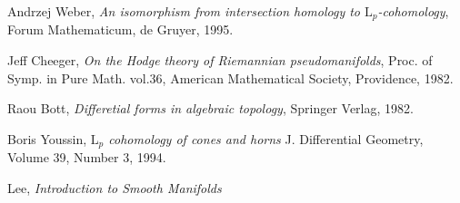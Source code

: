 \documentclass[licencjacka]{pracamgr}
\theoremstyle{definition}
\theoremstyle{definition}
\theoremstyle{plain}
\theoremstyle{plain}
\begin{document}
\begin{thebibliography}{99}

 Andrzej Weber, \textit{An isomorphism from
  intersection homology to $\mathrm{L}_p$-cohomology}, Forum
  Mathematicum, de Gruyer, 1995.
  
 Jeff Cheeger, \textit{On the Hodge theory
  of Riemannian pseudomanifolds}, Proc. of Symp. in Pure Math. vol.36,
  American Mathematical Society, Providence, 1982.

 Raou Bott, \textit{Differetial forms in algebraic
  topology}, Springer Verlag, 1982.

 Boris Youssin, \textit{$\mathrm{L}_p$
  cohomology of cones and horns } J. Differential Geometry, Volume 39,
  Number 3, 1994.
  
 Lee, \textit{Introduction to Smooth Manifolds}

\end{thebibliography}
\end{document}
